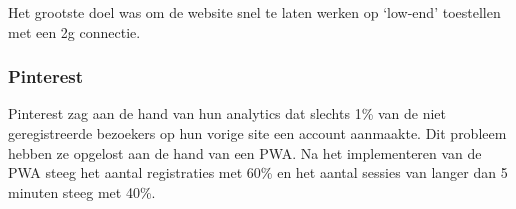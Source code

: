 Het grootste doel was om de website snel te laten werken op ‘low-end’ toestellen met een 2g connectie. 

\autocite{Croll2017}

\subsubsection{Pinterest}

Pinterest zag aan de hand van hun analytics dat slechts 1\% van de niet geregistreerde bezoekers op hun vorige site een account aanmaakte. Dit probleem hebben ze opgelost aan de hand van een PWA.
Na het implementeren van de PWA steeg het aantal registraties met 60\% en het aantal sessies van langer dan 5 minuten steeg met 40\%.

\autocite{Osmani2019b}



